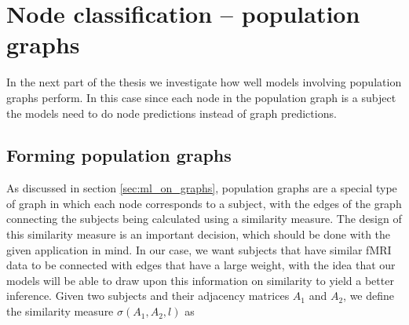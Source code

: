 
\section{Node classification -- population graphs}
In the next part of the thesis we investigate how well models involving population graphs perform. In this case since each node in the population graph is a subject the models need to do node predictions instead of graph predictions. 

\subsection{Forming population graphs}

As discussed in section \ref{sec:ml_on_graphs}, population graphs are a special type of graph in which each node corresponds to a subject, with the edges of the graph connecting the subjects being calculated using a similarity measure. The design of this similarity measure is an important decision, which should be done with the given application in mind. In our case, we want subjects that have similar fMRI data to be connected with edges that have a large weight, with the idea that our models will be able to draw upon this information on similarity to yield a better inference. Given two subjects and their adjacency matrices $A_1$ and $A_2$, we define the similarity measure $\sigma\left(A_1, A_2, l\right)$ as

